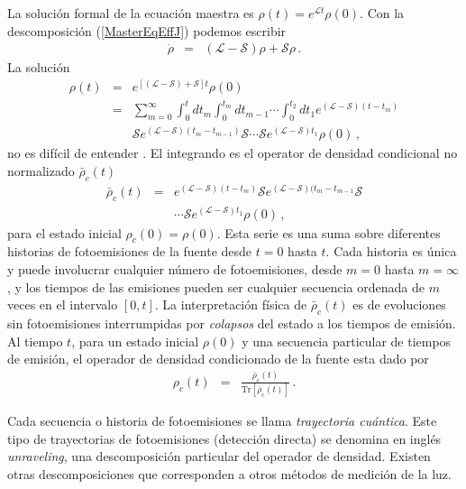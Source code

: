 \documentclass[twocolumn,aps,eqsecnum,showkeys,amsmath]{revtex4}
\newcommand{\mcL}{\mathcal{L}}
\newcommand{\mcS}{\mathcal{S}}
\newcommand{\Tr}{\mathrm{Tr}}
\begin{document}
La soluci\'on formal  de la ecuaci\'on maestra es $\rho(t) = e^{\mcL t} \rho (0)$. 
Con la descomposici\'on (\ref{MasterEqEffJ}) podemos escribir 
%
\begin{eqnarray} 	%
\dot{\rho} &=& ( \mcL - \mcS ) \rho  +\mcS \rho \,. 		
\end{eqnarray}
La soluci\'on 
%
\begin{eqnarray} 	%
\rho (t) &=& e^{ [( \mcL - \mcS ) +\mcS ] t} \rho (0)  	\nonumber \\ 
&=& 	\sum_{m=0}^{\infty} \int_0^t dt_m  \int_0^{t_m} dt_{m-1}  \cdots 	
	 \int_0^{t_2} dt_1 e^{ (\mcL - \mcS) (t-t_m)}  		\nonumber \\ 
	&& \mcS e^{ (\mcL - \mcS) (t_m-t_{m-1})} \mcS \cdots 
	\mcS  e^{ (\mcL - \mcS) t_1} \rho(0) \,,
\end{eqnarray}
no es dif\'icil de entender \cite{Carm93}. El integrando es el operator de densidad condicional no normalizado  $\bar{\rho}_c (t)$ 
%
\begin{eqnarray} 	\label{eq:condDensOp}
\bar{\rho}_c (t) &=& e^{ (\mcL - \mcS) (t-t_m)} \mcS 	
	 e^{ (\mcL - \mcS) (t_m-t_{m-1}} \mcS 	\nonumber \\  
	&&\cdots \mcS  e^{ (\mcL - \mcS) t_1} \rho(0) \,,
\end{eqnarray}
para el estado inicial $\rho_c (0) = \rho (0)$. Esta serie es una suma sobre diferentes 
historias de fotoemisiones de la fuente desde $t=0$ hasta $t$. Cada historia es 
\'unica y puede involucrar cualquier n\'umero de fotoemisiones, desde $m=0$ hasta $m=\infty$, y los tiempos de las emisiones pueden ser cualquier secuencia ordenada 
de $m$ veces en el intervalo $[0,t]$.  La interpretaci\'on f\'isica de $\bar{\rho}_c (t)$ 
es de evoluciones sin fotoemisiones interrumpidas por \textit{colapsos} del estado a 
los tiempos de emisi\'on. Al tiempo $t$, para un estado inicial $\rho (0)$ y una 
secuencia particular de tiempos de emisi\'on, el operador de densidad condicionado 
de la fuente esta dado por 
%
\begin{eqnarray} 	\label{eq:condDensOp}
\rho_c (t) &=& \frac{\bar{\rho}_c (t) }{ \Tr [\bar{\rho}_c (t) ]} \,.
\end{eqnarray}

Cada secuencia o historia de fotoemisiones se llama \textit{trayectoria cu\'antica}. 
Este tipo de trayectorias de fotoemisiones (detecci\'on directa)  se denomina en 
ingl\'es \textit{unraveling}, una descomposici\'on particular del operador de densidad. 
Existen otras descomposiciones que corresponden a otros m\'etodos de medici\'on 
de la luz. 
\end{document}
